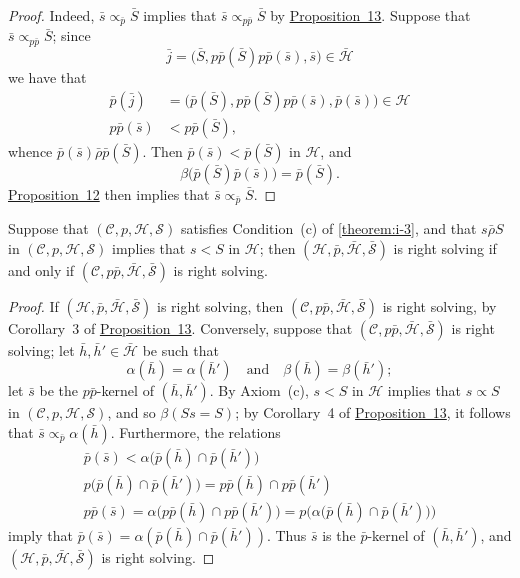 \documentclass[a4paper,fleqn]{article}
\theoremstyle{plain}
\newenvironment{proposition}[1]
  {\renewcommand\theinnerproposition{#1}\innerproposition}
  {\endinnerproposition}
\theoremstyle{definition}
\newcommand{\oldpage}[1]{{\marginpar{\footnotesize$\bigg\vert$\,\,\,\,\textit{p.~#1}}}}
\newcommand{\textand}{\quad\text{and}\quad}
\newcommand{\CC}{\mathcal{C}}
\newcommand{\HH}{\mathcal{H}}
\newcommand{\bHH}{\bar{\HH}}
\renewcommand{\SS}{\mathcal{S}}
\newcommand{\bSS}{\bar{\SS}}
\newcommand{\relrhobar}{\mathrel{\bar{\rho}}}
\newcommand{\subs}{\mathrel{\propto}}
\begin{document}
\oldpage{376}
\begin{proof}
  Indeed, $\bar{s}\subs_{\bar{p}}\bar{S}$ implies that $\bar{s}\subs_{p\bar{p}}\bar{S}$ by \hyperref[proposition:i-13]{Proposition~13}.
  Suppose that $\bar{s}\subs_{p\bar{p}}\bar{S}$;
  since
  \[
    \bar{j}
    = \big(
      \bar{S}, p\bar{p}(\bar{S})p\bar{p}(\bar{s}), \bar{s}
    \big)
    \in \bHH
  \]
  we have that
  \[
    \begin{aligned}
      \bar{p}(\bar{j})
      &= \big(
        \bar{p}(\bar{S}), p\bar{p}(\bar{S})p\bar{p}(\bar{s}), \bar{p}(\bar{s})
      \big)
      \in\HH
    \\p\bar{p}(\bar{s})
      &< p\bar{p}(\bar{S}),
    \end{aligned}
  \]
  whence $\bar{p}(\bar{s})\relrhobar\bar{p}(\bar{S})$.
  Then $\bar{p}(\bar{s})<\bar{p}(\bar{S})$ in $\HH$, and
  \[
    \beta\big(
      \bar{p}(\bar{S})\bar{p}(\bar{s})
    \big)
    = \bar{p}(\bar{S}).
  \]
  \hyperref[proposition:i-12]{Proposition~12} then implies that $\bar{s}\subs_{\bar{p}}\bar{S}$.
\end{proof}

\begin{proposition}{14}
\label{proposition:i-14}
  Suppose that $(\CC,p,\HH,\SS)$ satisfies Condition~(c) of \cref{theorem:i-3}, and that $s\relrhobar S$ in $(\CC,p,\HH,\SS)$ implies that $s<S$ in $\HH$;
  then $(\HH,\bar{p},\bHH,\bSS)$ is right solving if and only if $(\CC,p\bar{p},\bHH,\bSS)$ is right solving.
\end{proposition}

\begin{proof}
  If $(\HH,\bar{p},\bHH,\bSS)$ is right solving, then $(\CC,p\bar{p},\bHH,\bSS)$ is right solving, by Corollary~3 of \hyperref[proposition:i-13]{Proposition~13}.
  Conversely, suppose that $(\CC,p\bar{p},\bHH,\bSS)$ is right solving;
  let $\bar{h},\bar{h}'\in\bHH$ be such that
  \[
    \alpha(\bar{h})=\alpha(\bar{h}')
    \textand
    \beta(\bar{h})=\beta(\bar{h}');
  \]
  let $\bar{s}$ be the $p\bar{p}$-kernel of $(\bar{h},\bar{h}')$.
  By Axiom~(c), $s<S$ in $\HH$ implies that $s\subs S$ in $(\CC,p,\HH,\SS)$, and so $\beta(Ss=S)$;
  by Corollary~4 of \hyperref[proposition:i-13]{Proposition~13}, it follows that $\bar{s}\subs_{\bar{p}}\alpha(\bar{h})$.
  Furthermore, the relations
  \[
    \begin{gathered}
      \bar{p}(\bar{s})
      < \alpha\big(
        \bar{p}(\bar{h})\cap\bar{p}(\bar{h}')
      \big)
    \\p\big(
        \bar{p}(\bar{h})\cap\bar{p}(\bar{h}')
      \big)
      = p\bar{p}(\bar{h})\cap p\bar{p}(\bar{h}')
    \\p\bar{p}(\bar{s})
      = \alpha\big(
        p\bar{p}(\bar{h})\cap p\bar{p}(\bar{h}')
      \big)
      = p\big(
        \alpha\big(
          \bar{p}(\bar{h})\cap\bar{p}(\bar{h}')
        \big)
      \big)
    \end{gathered}
  \]
  imply that $\bar{p}(\bar{s})=\alpha(\bar{p}(\bar{h})\cap\bar{p}(\bar{h}'))$.
  Thus $\bar{s}$ is the $\bar{p}$-kernel of $(\bar{h},\bar{h}')$, and $(\HH,\bar{p},\bHH,\bSS)$ is right solving.
\end{proof}
\end{document}
